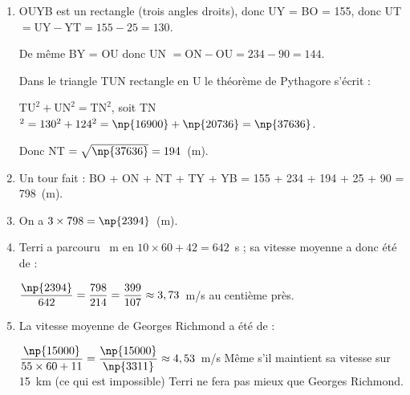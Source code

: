 \begin{enumerate}
\item %
OUYB est un rectangle (trois angles droits),  donc UY = BO = 155, donc UT $ = \text{UY} - \text{YT} = 155 - 25 = 130$.

De même BY = OU donc UN $ = \text{ON} - \text{OU} = 234 - 90 = 144$.

Dans le triangle TUN rectangle en U le théorème de Pythagore s'écrit : 

$\text{TU}^2 + \text{UN}^2 = \text{TN}^2$, soit TN$^2 = 130^2 + 124^2 = \np{16900} + \np{20736} = \np{37636}$.

Donc NT $ = \sqrt{\np{37636}} = 194$~(m).
\item %

Un tour fait : BO + ON + NT + TY + YB = 155 + 234 + 194 + 25 + 90 = 798~(m).
\item %
On a $3 \times 798 = \np{2394}$~(m). 
\item %

Terri a parcouru ~m en $10 \times 60 + 42 = 642$~s ; sa vitesse moyenne a donc été de :

$\dfrac{\np{2394}}{642} = \dfrac{798}{214} = \dfrac{399}{107} \approx 3,73$~m/s au centième près.
\item %
La vitesse moyenne de Georges Richmond a été de :

$\dfrac{\np{15000}}{55 \times 60 + 11} = \dfrac{\np{15000}}{\np{3311}}\approx 4,53$~m/s 
Même s'il maintient sa vitesse sur 15~km (ce qui est impossible) Terri ne fera pas mieux que Georges Richmond.
\end{enumerate}
 
\bigskip

